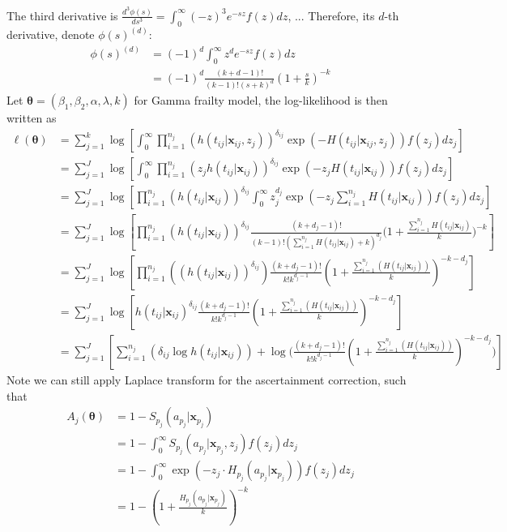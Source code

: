 \documentclass[preprint,12pt]{elsarticle}
\begin{document}
\noindent
The third derivative is $\frac{d^3\phi(s)}{ds^3}=\int_0^{\infty}(-z)^3e^{-sz}f(z)dz$, ...
Therefore, its $d$-th derivative, denote $\phi(s)^{(d)}$:
\begin{align}
    \phi(s)^{(d)}&=(-1)^d\int_0^{\infty}z^de^{-sz}f(z)dz\\
    &=(-1)^d\frac{(k+d-1)!}{(k-1)!(s+k)^d}(1+\frac{s}{k})^{-k}
\end{align}
Let $\boldsymbol{\theta}=(\beta_1, \beta_2, \alpha, \lambda, k)$ for Gamma frailty model, the log-likelihood is then written as
\begin{align}
    \ell(\boldsymbol{\theta})&=\sum_{j=1}^k\log \left [ \int_0^{\infty}\prod_{i=1}^{n_j}(h(t_{ij}|\mathbf{x}_{ij}, z_j))^{\delta_{ij}}\exp (-H(t_{ij}|\mathbf{x}_{ij}, z_j))f(z_j)dz_j\right ]\\
    &=\sum_{j=1}^J\log\left [\int_{0}^{\infty}\prod_{i=1}^{n_j}(z_j h(t_{ij}|\mathbf{x}_{ij}))^{\delta_{ij}}\exp(-z_j H(t_{ij}|\mathbf{x}_{ij}))f(z_j)dz_j\right ]\\
    &=\sum_{j=1}^J\log\left [\prod_{i=1}^{n_j}(h(t_{ij}|\mathbf{x}_{ij}))^{\delta_{ij}}\int_0^{\infty}z_j^{d_j}\exp(-z_j\sum_{i=1}^{n_j}H(t_{ij}|\mathbf{x}_{ij}))f(z_j)dz_j \right ]\\
    &=\sum_{j=1}^J\log\left [\prod_{i=1}^{n_j}(h(t_{ij}|\mathbf{x}_{ij}))^{\delta_{ij}}\frac{(k+d_j-1)!}{(k-1)!(\sum_{i=1}^{n_j}H(t_{ij}|\mathbf{x}_{ij})+k)^{d_j}}\Big(1+\frac{\sum_{i=1}^{n_j}H(t_{ij}|\mathbf{x}_{ij})}{k}\Big)^{-k}\right ]\\
    &=\sum_{j=1}^J\log\left [\prod_{i=1}^{n_j}((h(t_{ij}|\mathbf{x}_{ij}) )^{\delta_{ij}})\frac{(k+d_j-1)!}{k!k^{d_j-1}}(1+\frac{\sum_{i=1}^{n_j}(H(t_{ij}|\mathbf{x}_{ij}))}{k})^{-k-d_j} \right ]\\
    &=\sum_{j=1}^J\log\left [h(t_{ij}|\mathbf{x}_{ij})^{\delta_{ij}} \frac{(k+d_j-1)!}{k!k^{d_j-1}}(1+\frac{\sum_{i=1}^{n_j}(H(t_{ij}|\mathbf{x}_{ij}))}{k})^{-k-d_j} \right ]\\
    &=\sum_{j=1}^J\left [\sum_{i=1}^{n_j}(\delta_{ij}\log h(t_{ij}|\mathbf{x}_{ij})) + \log\Big (\frac{(k+d_j-1)!}{k!k^{d_j-1}}(1+\frac{\sum_{i=1}^{n_j}(H(t_{ij}|\mathbf{x}_{ij}))}{k})^{-k-d_j}\Big )\right ]
\end{align}
 Note we can still apply Laplace transform for the ascertainment correction, such that
\begin{align}
    A_j(\boldsymbol{\theta})&=1-S_{p_j}(a_{p_j}|\mathbf{x}_{p_j})\\
    &=1-\int_0^{\infty} S_{p_j}(a_{p_j}|\mathbf{x}_{p_j},z_j)f(z_j)dz_j\\
    &=1-\int_0^{\infty}\exp(-z_j\cdot H_{p_j}(a_{p_j}|\mathbf{x}_{p_j}))f(z_j)dz_j\\
    &=1-(1+\frac{H_{p_j}(a_{p_j}|\mathbf{x}_{p_j})}{k})^{-k}
\end{align}
\end{document}
